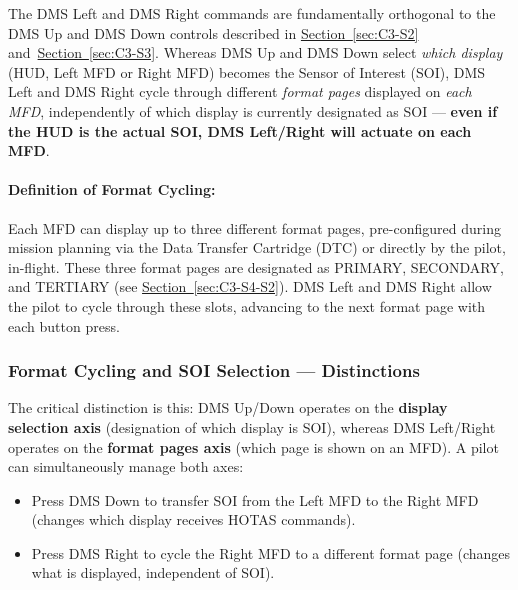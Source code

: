 \documentclass[11pt, a4paper, twoside]{report}
\newcommand{\secref}[1]{\hyperref[#1]{Section~\ref*{#1}}}
\begin{document}
The DMS Left and DMS Right commands are fundamentally orthogonal to the DMS Up and DMS Down controls described in \secref{sec:C3-S2} and~\secref{sec:C3-S3}. Whereas DMS Up and DMS Down select \textit{which display} (HUD, Left MFD or Right MFD) becomes the Sensor of Interest (SOI), DMS Left and DMS Right cycle through different \textit{format pages} displayed on \textit{each MFD}, independently of which display is currently designated as SOI --- \textbf{even if the HUD is the actual SOI, DMS Left/Right will actuate on each MFD}.

\paragraph{Definition of Format Cycling:}

Each MFD can display up to three different format pages, pre-configured during mission planning via the Data Transfer Cartridge (DTC) or directly by the pilot, in-flight. These three format pages are designated as PRIMARY, SECONDARY, and TERTIARY (see \secref{sec:C3-S4-S2}). DMS Left and DMS Right allow the pilot to cycle through these slots, advancing to the next format page with each button press.
\subsubsection{Format Cycling and SOI Selection --- Distinctions}
\label{sec:C3-S4-S1-S1}

The critical distinction is this: DMS Up/Down operates on the \textbf{display selection axis} (designation of which display is SOI), whereas DMS Left/Right operates on the \textbf{format pages axis} (which page is shown on an MFD). A pilot can simultaneously manage both axes:

\begin{itemize}
	
	\item Press DMS Down to transfer SOI from the Left MFD to the Right MFD (changes which display receives HOTAS commands).
	
	\item Press DMS Right to cycle the Right MFD to a different format page (changes what is displayed, independent of SOI).
	
\end{itemize}
\end{document}
